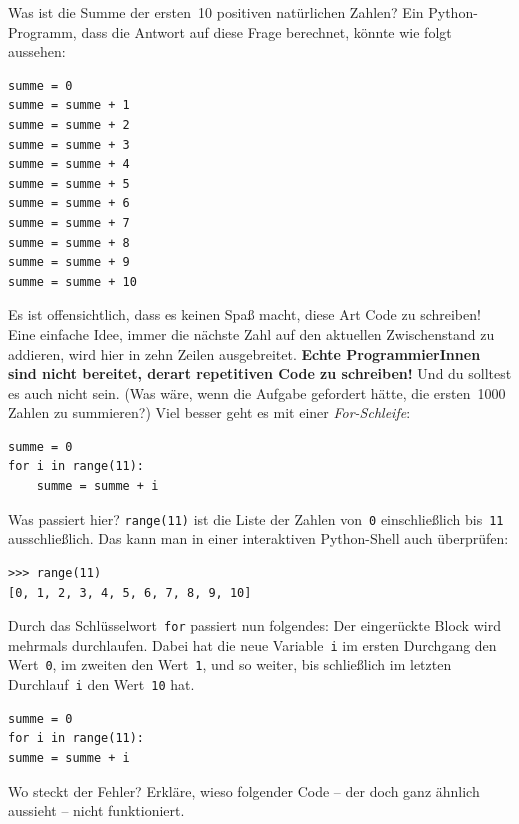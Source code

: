 \documentclass{blatt}
\begin{document}
Was ist die Summe der ersten~10 positiven natürlichen Zahlen? Ein
Python-Programm, dass die Antwort auf diese Frage berechnet, könnte wie folgt
aussehen:
\begin{verbatim}
summe = 0
summe = summe + 1
summe = summe + 2
summe = summe + 3
summe = summe + 4
summe = summe + 5
summe = summe + 6
summe = summe + 7
summe = summe + 8
summe = summe + 9
summe = summe + 10
\end{verbatim}
Es ist offensichtlich, dass es keinen Spaß macht, diese Art Code zu schreiben!
Eine einfache Idee, immer die nächste Zahl auf den aktuellen Zwischenstand zu
addieren, wird hier in zehn Zeilen ausgebreitet. \textbf{Echte ProgrammierInnen
sind nicht bereitet, derart repetitiven Code zu schreiben!} Und du solltest es
auch nicht sein. (Was wäre, wenn die Aufgabe gefordert hätte, die ersten~1000
Zahlen zu summieren?) Viel besser geht es mit einer \emph{For-Schleife}:
\begin{verbatim}
summe = 0
for i in range(11):
    summe = summe + i
\end{verbatim}
Was passiert hier? \texttt{range(11)} ist die Liste der Zahlen
von~\texttt{0} einschließlich bis~\texttt{11}
ausschließlich. Das kann man in einer interaktiven Python-Shell auch
überprüfen:
\begin{verbatim}
>>> range(11)
[0, 1, 2, 3, 4, 5, 6, 7, 8, 9, 10]
\end{verbatim}
Durch das Schlüsselwort~\texttt{for} passiert nun folgendes: Der
eingerückte Block wird mehrmals durchlaufen. Dabei hat die neue
Variable~\texttt{i} im ersten Durchgang den
Wert~\texttt{0}, im zweiten den Wert~\texttt{1}, und so
weiter, bis schließlich im letzten Durchlauf~\texttt{i} den
Wert~\texttt{10} hat.

\begin{lrbox}{\foobox}\begin{minipage}{\textwidth}\begin{verbatim}
summe = 0
for i in range(11):
summe = summe + i
\end{verbatim}
\end{minipage}\end{lrbox}
\begin{aufgabe}{Wo steckt der Fehler?}
Erkläre, wieso folgender Code -- der doch ganz ähnlich aussieht -- nicht
funktioniert.

\usebox{\foobox}
\end{aufgabe}
\end{document}
